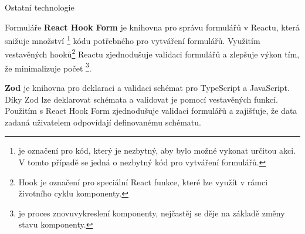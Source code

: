 \begin{subsection}{Ostatní technologie}
\begin{subsubsection}{Formuláře}
        \textbf{React Hook Form} je knihovna pro správu formulářů v Reactu, která snižuje množství \footnote{ je označení pro kód, který je nezbytný, aby bylo možné vykonat určitou akci.
        V tomto případě se jedná o nezbytný kód pro vytváření formulářů.} kódu potřebného pro vytváření formulářů.
        Využitím vestavěných hooků\footnote{Hook je označení pro speciální React funkce, které lze využít v rámci životního cyklu komponenty\cite{fos_projects_react}.} Reactu zjednodušuje validaci formulářů a zlepšuje výkon tím, že minimalizuje počet \footnote{ je proces znovuvykreslení komponenty, nejčastěj se děje na základě změny stavu komponenty.}.

        \textbf{Zod} je knihovna pro deklaraci a validaci schémat pro TypeScript a JavaScript.
        Díky Zod lze deklarovat schémata a validovat je pomocí vestavěných funkcí.
        Použitím s React Hook Form zjednodušuje validaci formulářů a zajišťuje, že data zadaná uživatelem odpovídají definovanému schématu.
    \end{subsubsection}
\end{subsection}

